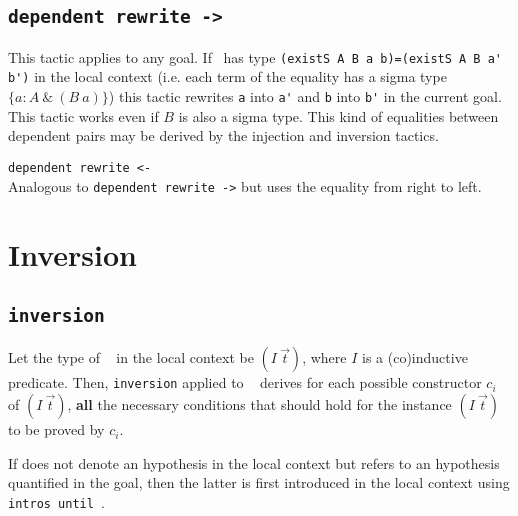 \subsection{\tt dependent rewrite -> {\ident}
\label{dependent-rewrite}}

This tactic applies to any goal.  If \ident\ has type 
\verb+(existS A B a b)=(existS A B a' b')+ 
in the local context (i.e. each term of the
equality has a sigma type $\{ a:A~ \&~(B~a)\}$) this tactic rewrites
\verb+a+ into \verb+a'+ and \verb+b+ into \verb+b'+ in the current
goal. This tactic works even if $B$ is also a sigma type.  This kind
of equalities between dependent pairs may be derived by the injection
and inversion tactics.

\begin{Variants}
\item{\tt dependent rewrite <- {\ident}}
 \\
Analogous to {\tt dependent rewrite ->} but uses the equality from
right to left.
\end{Variants}

\section{Inversion
\label{inversion}}

\subsection{\tt inversion {\ident}
}

Let the type of \ident~ in the local context be $(I~\vec{t})$,
where $I$ is a (co)inductive predicate. Then,
\texttt{inversion} applied to \ident~ derives for each possible
constructor $c_i$ of $(I~\vec{t})$, {\bf all} the necessary
conditions that should hold for the instance $(I~\vec{t})$ to be
proved by $c_i$.

\Rem If {\ident} does not denote an hypothesis in the local context
but refers to an hypothesis quantified in the goal, then the
latter is first introduced in the local context using
\texttt{intros until \ident}.

